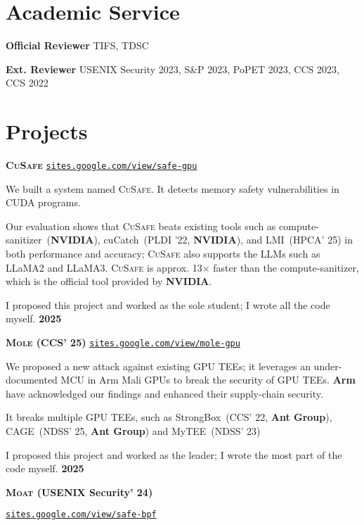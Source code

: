 \documentclass{resume}
\begin{document}
\section{Academic Service}
\begin{content}
  {\bf Official Reviewer} \enspace TIFS, TDSC

		{\bf Ext. Reviewer} \enspace USENIX Security 2023, S\&P 2023, PoPET 2023, CCS 2023, CCS 2022
\end{content}

\section{Projects}

\begin{content}
  {\bf \textbf{\textsc{CuSafe}}} \enspace
  {\href{https://sites.google.com/view/safe-gpu/}{\texttt{sites.google.com/view/safe-gpu}}}

  {We built a system named \textsc{CuSafe}. It detects memory safety vulnerabilities in CUDA programs.}

  {Our evaluation shows that \textsc{CuSafe} beats existing tools such as compute-sanitizer~(\textbf{NVIDIA}), cuCatch~(PLDI '22, \textbf{NVIDIA}), and LMI~(HPCA' 25) in both performance and accuracy; \textsc{CuSafe} also supports the LLMs such as LLaMA2 and LLaMA3. \textsc{CuSafe} is approx. 13$\times$ faster than the compute-sanitizer, which is the official tool provided by \textbf{NVIDIA}.}

  {I proposed this project and worked as the sole student; I wrote all the code myself.}
  \hfill {\bf 2025}


  {\bf \textbf{\textsc{Mole}} (CCS' 25)} \enspace
  {\href{https://sites.google.com/view/mole-gpu}{\texttt{sites.google.com/view/mole-gpu}}}

  {We proposed a new attack against existing GPU TEEs; it leverages an under-documented MCU in Arm Mali GPUs to break the security of GPU TEEs. \textbf{Arm} have acknowledged our findings and enhanced their supply-chain security.}

  {It breaks multiple GPU TEEs, such as StrongBox~(CCS' 22, \textbf{Ant Group}), CAGE~(NDSS' 25, \textbf{Ant Group}) and MyTEE~(NDSS' 23)}

  {I proposed this project and worked as the leader; I wrote the most part of the code myself.}
  \hfill{\bf 2025}


  {\bf \textbf{\textsc{Moat}} (USENIX Security' 24)} \enspace
  {\href{https://sites.google.com/view/safe-bpf/}{\texttt{sites.google.com/view/safe-bpf}}
    
}
\end{content}
\end{document}
